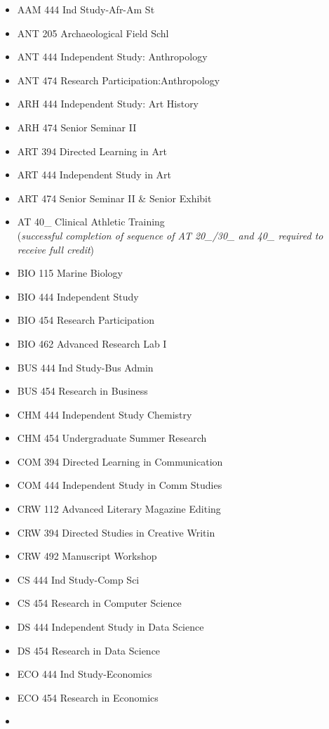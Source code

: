 \documentclass[
  letterpaper,
]{scrbook}
\providecommand{\tightlist}{%
  \setlength{\itemsep}{0pt}\setlength{\parskip}{0pt}}
\begin{document}
\begin{itemize}
\tightlist
\item
  AAM 444 Ind Study-Afr-Am St
\item
  ANT 205 Archaeological Field Schl
\item
  ANT 444 Independent Study: Anthropology
\item
  ANT 474 Research Participation:Anthropology
\item
  ARH 444 Independent Study: Art History
\item
  ARH 474 Senior Seminar II
\item
  ART 394 Directed Learning in Art
\item
  ART 444 Independent Study in Art
\item
  ART 474 Senior Seminar II \& Senior Exhibit
\item
  AT 40\_ Clinical Athletic Training\\
  (\emph{successful completion of sequence of AT 20\_/30\_ and 40\_
  required to receive full credit})
\item
  BIO 115 Marine Biology
\item
  BIO 444 Independent Study
\item
  BIO 454 Research Participation
\item
  BIO 462 Advanced Research Lab I
\item
  BUS 444 Ind Study-Bus Admin
\item
  BUS 454 Research in Business
\item
  CHM 444 Independent Study Chemistry
\item
  CHM 454 Undergraduate Summer Research
\item
  COM 394 Directed Learning in Communication
\item
  COM 444 Independent Study in Comm Studies
\item
  CRW 112 Advanced Literary Magazine Editing
\item
  CRW 394 Directed Studies in Creative Writin
\item
  CRW 492 Manuscript Workshop
\item
  CS 444 Ind Study-Comp Sci
\item
  CS 454 Research in Computer Science
\item
  DS 444 Independent Study in Data Science
\item
  DS 454 Research in Data Science
\item
  ECO 444 Ind Study-Economics
\item
  ECO 454 Research in Economics
\item

\end{itemize}
\end{document}
